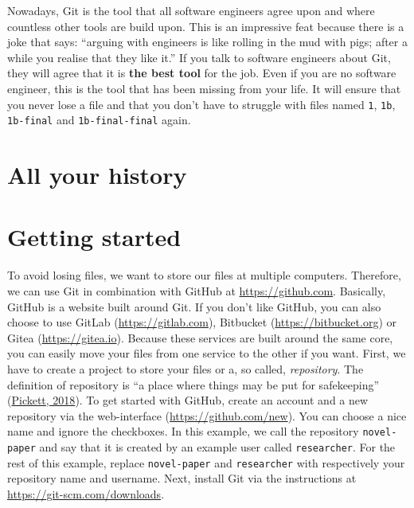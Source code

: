 \documentclass[
  14pt
  american,
  paper=a4,
  ,captions=tableheading
]{scrbook}
\newcommand{\passthrough}[1]{#1}
\begin{document}
Nowadays, Git is the tool that all software engineers agree upon and
where countless other tools are build upon. This is an impressive feat
because there is a joke that says: ``arguing with engineers is like
rolling in the mud with pigs; after a while you realise that they like
it.'' If you talk to software engineers about Git, they will agree that
it is \textbf{the best tool} for the job. Even if you are no software
engineer, this is the tool that has been missing from your life. It will
ensure that you never lose a file and that you don't have to struggle
with files named \passthrough{\lstinline!1!},
\passthrough{\lstinline!1b!}, \passthrough{\lstinline!1b-final!} and
\passthrough{\lstinline!1b-final-final!} again.

\hypertarget{sec:git-history}{%
\section{All your history}\label{sec:git-history}}

\hypertarget{getting-started}{%
\section{Getting started}\label{getting-started}}

To avoid losing files, we want to store our files at multiple computers.
Therefore, we can use Git in combination with GitHub at
\url{https://github.com}. Basically, GitHub is a website built around
Git. If you don't like GitHub, you can also choose to use GitLab
(\url{https://gitlab.com}), Bitbucket (\url{https://bitbucket.org}) or
Gitea (\url{https://gitea.io}). Because these services are built around
the same core, you can easily move your files from one service to the
other if you want. First, we have to create a project to store your
files or a, so called, \emph{repository}. The definition of repository
is ``a place where things may be put for safekeeping''
(\protect\hyperlink{ref-pickett2018american}{Pickett, 2018}). To get
started with GitHub, create an account and a new repository via the
web-interface (\url{https://github.com/new}). You can choose a nice name
and ignore the checkboxes. In this example, we call the repository
\passthrough{\lstinline!novel-paper!} and say that it is created by an
example user called \passthrough{\lstinline!researcher!}. For the rest
of this example, replace \passthrough{\lstinline!novel-paper!} and
\passthrough{\lstinline!researcher!} with respectively your repository
name and username. Next, install Git via the instructions at
\url{https://git-scm.com/downloads}.
\end{document}
